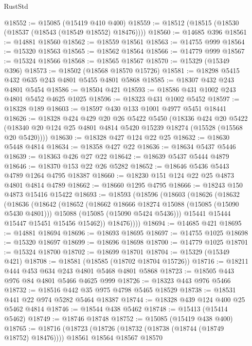 \begin{lexlean}{RustStd}
\begin{coremodule}
@18552 := @15085 (@15419 @410 @400)
@18559 := @18512 (@18515 (@18530 (@18537 (@18543 (@18549 @18552) @18476))))
@18560 := @14685 @396
@18561 := @14881 @18560
@18562 := @18559 @18561
@18563 := @14755 @999
@18564 := @15320 @18563
@18565 := @18562 @18564
@18566 := @14779 @999
@18567 := @15324 @18566
@18568 := @18565 @18567
@18570 := @15329 (@15349 @396)
@18573 := @18502 (@18568 @18570 @15726)
@18581 := @18298 @5415 @432 @635 @243 @4801 @5455 @4801 @5868
@18585 := @18307 @432 @243 @4801 @5454
@18586 := @18504 @421
@18593 := @18586 @431 @1002 @243 @4801 @5452 @4625 @1025
@18596 := @18323 @431 @1002 @5452
@18597 := @18328 @189
@18603 := @18597 @430 @133 @1001 @4977 @5451 @18441
@18626 := @18328
    @424
    @429
    @20
    @26
    @5422
    @5450
    (@18336
      @424
      @20
      @5422
      (@18340 @20 @124 @25 @4801 @4814 @5420 @15239 @18274 (@15528 (@15568 @20 @5420))))
@18630 := @18328 @427 @124 @22 @25
@18632 := @18630 @5448 @4814
@18634 := @18358 @427 @22
@18636 := @18634 @5437 @5446
@18639 := @18363 @426 @27 @22
@18642 := @18639 @5437 @5444 @4879
@18646 := @18370 @153 @22 @26 @5282
@18652 := @18646 @5436 @5443 @4789 @1264 @4795 @18387
@18660 := @18230 @151 @124 @22 @25 @4873 @4801 @4814 @4789
@18662 := @18660 @1295 @4795
@18666 := @18243 @150 @4873 @15416 @15422
@18693 := @18593
    (@18596
      (@18603
        (@18626
          (@18632
            (@18636
              (@18642
                (@18652
                  (@18662 @18666 @18274 @15088 (@15085 (@15090 @5430 @4801)))
                  @15088
                  (@15085 (@15090 @5424 @5436)))
                @15441
                @15444
                @15447
                @15451
                @15456
                @15462))
            @18476))))
@18694 := @14685 @421
@18695 := @14881 @18694
@18696 := @18693 @18695
@18697 := @14755 @1025
@18698 := @15320 @18697
@18699 := @18696 @18698
@18700 := @14779 @1025
@18701 := @15324 @18700
@18702 := @18699 @18701
@18704 := @15329 (@15349 @421)
@18708 := @18581 (@18585 (@18702 @18704 @15726))
@18716 := @18211 @444 @453 @634 @243 @4801 @5468 @4801 @5868
@18723 := @18505 @443 @976 @84 @4801 @5466 @4625 @999
@18726 := @18323 @443 @976 @5466
@18732 := @18516 @442 @35 @975 @4798 @5465 @18529
@18738 := @18531 @441 @22 @974 @5282 @5464 @18387
@18744 := @18328 @439 @124 @400 @25 @5462 @4814
@18746 := @18544 @438 @5462
@18748 := @15413 (@15414 @5462)
@18749 := @18746 @18748
@18752 := @15085 (@15419 @438 @400)
@18765 := @18716
    (@18723
      (@18726 (@18732 (@18738 (@18744 (@18749 @18752) @18476))))
      @18561
      @18564
      @18567
      @18570

\end{coremodule}
\end{lexlean}
